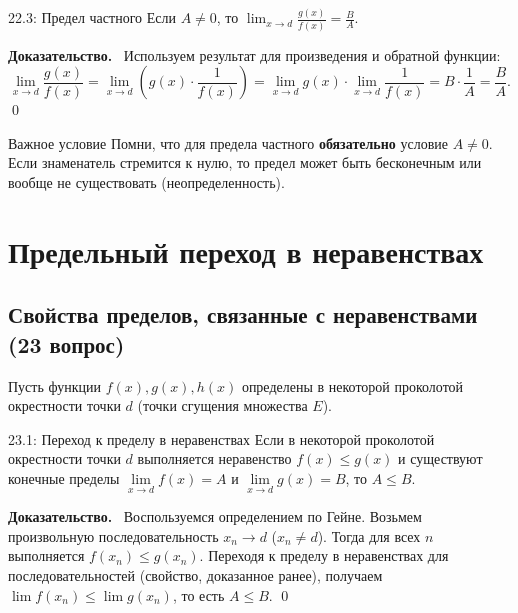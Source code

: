\documentclass[a4paper,12pt]{article}
\newcommand{\myproof}{\textbf{Доказательство.}\ }
\begin{document}
	\vspace{0.5cm}
	\begin{theorembox}{22.3: Предел частного}
		Если $A \neq 0$, то $\lim_{x \to d} \frac{g(x)}{f(x)} = \frac{B}{A}$.
	\end{theorembox}
	
	\vspace{0.5cm}
	\myproof
	Используем результат для произведения и обратной функции:
	\[ \lim_{x \to d} \frac{g(x)}{f(x)} = \lim_{x \to d} \left( g(x) \cdot \frac{1}{f(x)} \right) = \lim_{x \to d} g(x) \cdot \lim_{x \to d} \frac{1}{f(x)} = B \cdot \frac{1}{A} = \frac{B}{A}. \] \qed
	
	\vspace{0.5cm}
	\begin{importantbox}{Важное условие}
		Помни, что для предела частного \textbf{обязательно} условие $A \neq 0$. Если знаменатель стремится к нулю, то предел может быть бесконечным или вообще не существовать (неопределенность).
	\end{importantbox}
	
	
	
	
	
	
	\newpage
	\section{Предельный переход в неравенствах}
	
	\subsection{Свойства пределов, связанные с неравенствами (23 вопрос)}
	
	Пусть функции $f(x), g(x), h(x)$ определены в некоторой проколотой окрестности точки $d$ (точки сгущения множества $E$).
	
	\begin{theorembox}{23.1: Переход к пределу в неравенствах}
		Если в некоторой проколотой окрестности точки $d$ выполняется неравенство $f(x) \le g(x)$ и существуют конечные пределы $\lim\limits_{x \to d} f(x) = A$ и $\lim\limits_{x \to d} g(x) = B$, то $A \le B$.
	\end{theorembox}
	
	\vspace{0.5cm}
	\myproof
	Воспользуемся определением по Гейне. Возьмем произвольную последовательность $x_n \to d$ ($x_n \neq d$). Тогда для всех $n$ выполняется $f(x_n) \le g(x_n)$. Переходя к пределу в неравенствах для последовательностей (свойство, доказанное ранее), получаем $\lim f(x_n) \le \lim g(x_n)$, то есть $A \le B$. \qed
	
\end{document}
